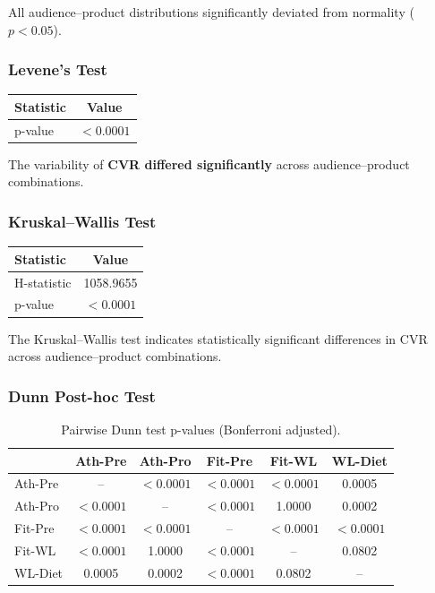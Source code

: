 All audience--product distributions significantly deviated from normality ($p<0.05$).

\vspace{0.3cm}

\subsubsection{Levene's Test}

\begin{table}[H]
	\centering
	\begin{tabular}{lc}
		\toprule
		Statistic & Value \\
		\midrule
		p-value & $<0.0001$ \\
		\bottomrule
	\end{tabular}
\end{table}

The variability of \textbf{CVR differed significantly} across audience--product combinations.

\vspace{0.3cm}

\subsubsection{Kruskal--Wallis Test}

\begin{table}[H]
	\centering
	\begin{tabular}{lc}
		\toprule
		Statistic & Value \\
		\midrule
		H-statistic & 1058.9655 \\
		p-value & $<0.0001$ \\
		\bottomrule
	\end{tabular}
\end{table}

The Kruskal--Wallis test indicates statistically significant differences in CVR across audience--product combinations.

\vspace{0.3cm}

\subsubsection{Dunn Post-hoc Test}

\begin{table}[H]
	\centering
	\caption{Pairwise Dunn test p-values (Bonferroni adjusted).}
	\begin{tabular}{lccccc}
		\toprule
		& Ath-Pre & Ath-Pro & Fit-Pre & Fit-WL & WL-Diet \\
		\midrule
		Ath-Pre & -- & $<0.0001$ & $<0.0001$ & $<0.0001$ & 0.0005 \\
		Ath-Pro & $<0.0001$ & -- & $<0.0001$ & 1.0000 & 0.0002 \\
		Fit-Pre & $<0.0001$ & $<0.0001$ & -- & $<0.0001$ & $<0.0001$ \\
		Fit-WL & $<0.0001$ & 1.0000 & $<0.0001$ & -- & 0.0802 \\
		WL-Diet & 0.0005 & 0.0002 & $<0.0001$ & 0.0802 & -- \\
		\bottomrule
	\end{tabular}
\end{table}

